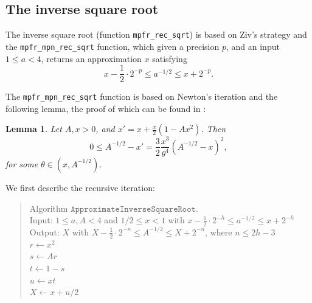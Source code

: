 \documentclass[12pt]{amsart}
\def\q{\hspace*{5mm}}
\newtheorem{lemma}{Lemma}
\begin{document}
\subsection{The inverse square root}

The inverse square root (function \texttt{mpfr\_rec\_sqrt}) is based on
Ziv's strategy and the \texttt{mpfr\_mpn\_rec\_sqrt} function, which given
a precision $p$, and an input $1 \leq a < 4$,
returns an approximation $x$ satisfying 
\[ x - \frac{1}{2} \cdot 2^{-p} \leq a^{-1/2} \leq x + 2^{-p}. \]

The \texttt{mpfr\_mpn\_rec\_sqrt} function is based on Newton's iteration
and the following lemma,
the proof of which can be found in \cite{BrZi06}:
\begin{lemma} \label{lemma3}
Let $A, x > 0$, and $x' = x + \frac{x}{2} (1 - Ax^2)$. Then
\[ 0 \leq A^{-1/2} - x' = \frac{3}{2} \frac{x^3}{\theta^4} (A^{-1/2}-x)^2, \]
for some $\theta \in (x, A^{-1/2})$.
\end{lemma}

We first describe the recursive iteration:
\begin{quote}
Algorithm $\texttt{ApproximateInverseSquareRoot}$. \\
Input: $1 \leq a, A < 4$ and $1/2 \leq x < 1$ with
$x - \frac{1}{2} \cdot 2^{-h} \leq a^{-1/2} \leq x + 2^{-h}$ \\
Output: $X$ with $X - \frac{1}{2} \cdot 2^{-n} \leq A^{-1/2} \leq X + 2^{-n}$,
where $n \leq 2h-3$ \\
\q $r \leftarrow x^2$ \qquad [exact] \\
\q $s \leftarrow A r$ \qquad [exact] \\
\q $t \leftarrow 1-s$ \\
\q $u \leftarrow x t$ \qquad [exact] \\
\q $X \leftarrow x + u/2$ 
\end{quote}
\end{document}
